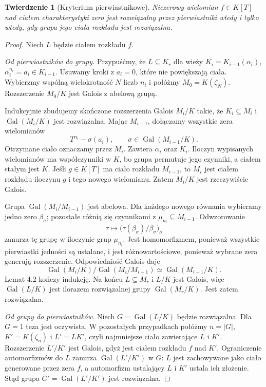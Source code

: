\documentclass[11pt,a4paper,oneside]{book}
\numberwithin{equation}{section}
\theoremstyle{plain}
\newtheorem{twierdzenie}{Twierdzenie}[chapter]
\theoremstyle{definition}
\theoremstyle{remark}
\newcommand{\Gal}{\operatorname{Gal}}
\begin{document}
\begin{twierdzenie}[Kryterium pierwiastnikowe]
Niezerowy wielomian $f\in K[T]$ nad ciałem charakterystyki zero jest rozwiązalny przez pierwiastniki wtedy i tylko wtedy, gdy grupa jego ciała rozkładu jest rozwiązalna.
\end{twierdzenie}
\begin{proof}
Niech $L$ będzie ciałem rozkładu $f$.

\emph{Od pierwiastników do grupy.} Przypuśćmy, że $L\subseteq K_r$ dla wieży $K_i=K_{i-1}(\alpha_i)$, $\alpha_i^{n_i}=a_i\in K_{i-1}$. Usuwamy kroki z $a_i=0$, które nie powiększają ciała. Wybierzmy wspólną wielokrotność $N$ liczb $n_i$ i połóżmy $M_0=K(\zeta_N)$. Rozszerzenie $M_0/K$ jest Galois z abelową grupą.

Indukcyjnie zbudujemy skończone rozszerzenia Galois $M_i/K$ takie, że $K_i\subseteq M_i$ i $\Gal(M_i/K)$ jest rozwiązalna. Mając $M_{i-1}$, dołączamy wszystkie zera wielomianów
\[
T^{n_i}-\sigma(a_i),\qquad \sigma\in\Gal(M_{i-1}/K).
\]
Otrzymane ciało oznaczamy przez $M_i$. Zawiera $\alpha_i$ oraz $K_i$. Iloczyn wypisanych wielomianów ma współczynniki w $K$, bo grupa permutuje jego czynniki, a ciałem stałym jest $K$. Jeśli $g\in K[T]$ ma ciało rozkładu $M_{i-1}$, to $M_i$ jest ciałem rozkładu iloczynu $g$ i tego nowego wielomianu. Zatem $M_i/K$ jest rzeczywiście Galois.

Grupa $\Gal(M_i/M_{i-1})$ jest abelowa. Dla każdego nowego równania wybieramy jedno zero $\beta_\sigma$; pozostałe różnią się czynnikami z $\mu_{n_i}\subseteq M_{i-1}$. Odwzorowanie
\[
\tau\longmapsto\bigl(\tau(\beta_\sigma)/\beta_\sigma\bigr)_\sigma
\]
zanurza tę grupę w iloczynie grup $\mu_{n_i}$. Jest homomorfizmem, ponieważ wszystkie pierwiastki jedności są ustalane, i jest różnowartościowe, ponieważ wybrane zera generują rozszerzenie. Odpowiedniość Galois daje
\[
\Gal(M_i/K)/\Gal(M_i/M_{i-1})\simeq\Gal(M_{i-1}/K).
\]
Lemat 4.2 kończy indukcję. Na końcu $L\subseteq M_r$ i $L/K$ jest Galois, więc $\Gal(L/K)$ jest ilorazem rozwiązalnej grupy $\Gal(M_r/K)$. Jest zatem rozwiązalna.

\emph{Od grupy do pierwiastników.} Niech $G=\Gal(L/K)$ będzie rozwiązalna. Dla $G=1$ teza jest oczywista. W pozostałych przypadkach połóżmy $n=|G|$, $K'=K(\zeta_n)$ i $L'=LK'$, czyli najmniejsze ciało zawierające $L$ i $K'$. Rozszerzenie $L'/K'$ jest Galois, gdyż jest ciałem rozkładu $f$ nad $K'$. Ograniczenie automorfizmów do $L$ zanurza $\Gal(L'/K')$ w $G$: $L$ jest zachowywane jako ciało generowane przez zera $f$, a automorfizm ustalający $L$ i $K'$ ustala ich złożenie. Stąd grupa $G'=\Gal(L'/K')$ jest rozwiązalna.


\end{proof}
\end{document}
